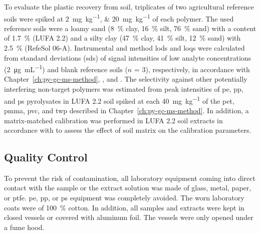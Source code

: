To evaluate the plastic recovery from soil, triplicates of two agricultural reference soils were spiked at \SIlist{2;20}{\milli\gram\per\kilo\gram} of each polymer. The used reference soils were a loamy sand (\SI{8}{\percent} clay, \SI{16}{\percent} silt, \SI{76}{\percent} sand) with a  content of \SI{1.7}{\percent} (LUFA 2.2) and a silty clay (\SI{47}{\percent} clay, \SI{41}{\percent} silt, \SI{12}{\percent} sand) with \SI{2.5}{\percent}  (RefeSol 06-A).
Instrumental and method \acp{lod} and \acp{loq} were calculated from standard deviations (\acp{sd}) of signal intensities of low analyte concentrations (\SI{2}{\micro\gram\per\milli\liter}) and blank reference soils ($n$ = 3), respectively, in accordance with Chapter~\ref{ch:py-gc-ms-method}, \citet{DIN32645Chemical2008}, and \citet{MagnussonEurachem2014}. The selectivity against other potentially interfering non-target polymers was estimated from peak intensities of \ac{pe}, \ac{pp}, and \ac{ps} pyrolysates in LUFA 2.2 soil spiked at each \SI{40}{\milli\gram\per\kilo\gram} of the \ac{pet}, \ac{pmma}, \ac{pvc}, and \ac{twp} described in Chapter~\ref{ch:py-gc-ms-method}.
In addition, a matrix-matched calibration was performed in LUFA 2.2 soil extracts in accordance with \citet{MagnussonEurachem2014} to assess the effect of soil matrix on the calibration parameters.

\subsection{Quality Control}

To prevent the risk of contamination, all laboratory equipment coming into direct contact with the sample or the extract solution was made of glass, metal, paper, or \ac{ptfe}. \ac{pe}, \ac{pp}, or \ac{ps} equipment was completely avoided. The worn laboratory coats were of \SI{100}{\percent} cotton. In addition, all samples and extracts were kept in closed vessels or covered with aluminum foil. The vessels were only opened under a fume hood.

